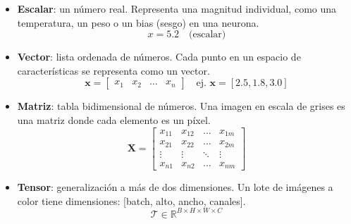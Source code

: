 \documentclass[12pt,a4paper,openany,oneside]{book}
\begin{document}
\begin{itemize}
    \item \textbf{Escalar}: un número real. Representa una magnitud individual, como una temperatura, un peso o un bias (sesgo) en una neurona.
    \begin{equation*}
        x = 5.2 \quad \text{(escalar)}
    \end{equation*}
    
    \item \textbf{Vector}: lista ordenada de números. Cada punto en un espacio de características se representa como un vector.
    \begin{equation*}
        \mathbf{x} = \begin{bmatrix} x_1 & x_2 & \dots & x_n \end{bmatrix} \quad \text{ej. } \mathbf{x} = [2.5, 1.8, 3.0]
    \end{equation*}
    
    \item \textbf{Matriz}: tabla bidimensional de números. Una imagen en escala de grises es una matriz donde cada elemento es un píxel.
    \begin{equation*}
        \mathbf{X} = \begin{bmatrix}
            x_{11} & x_{12} & \dots & x_{1m} \\
            x_{21} & x_{22} & \dots & x_{2m} \\
            \vdots & \vdots & \ddots & \vdots \\
            x_{n1} & x_{n2} & \dots & x_{nm}
        \end{bmatrix}
    \end{equation*}
    
    \item \textbf{Tensor}: generalización a más de dos dimensiones. Un lote de imágenes a color tiene dimensiones: [batch, alto, ancho, canales].
    \begin{equation*}
        \mathcal{T} \in \mathbb{R}^{B \times H \times W \times C}
    \end{equation*}
\end{itemize}
\end{document}
